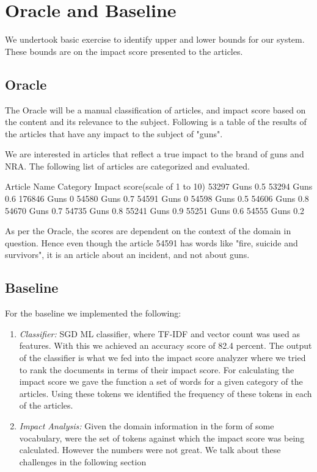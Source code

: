 \documentclass{article}
\begin{document}

\section{Oracle and Baseline} %

We undertook basic exercise to identify upper and lower bounds for our system. These bounds are on the impact score presented to the articles.

\subsection{Oracle}
The Oracle will be a manual classification of articles, and impact score based on the content and its relevance to the subject.
Following is a table of the results of the articles that have any impact to the subject of "guns".

We are interested in articles that reflect a true impact to the brand of guns and NRA.
The following list of articles are categorized and evaluated.

Article Name    Category    Impact score(scale of 1 to 10)
53297           Guns    0.5
53294           Guns    0.6
176846          Guns        0
54580           Guns      0.7
54591           Guns      0
54598           Guns        0.5
54606           Guns        0.8
54670           Guns        0.7
54735           Guns        0.8
55241           Guns        0.9
55251           Guns        0.6
54555           Guns        0.2

As per the Oracle, the scores are dependent on the context of the domain in question.
Hence even though the article 54591 has words like "fire, suicide and survivors", it is an article about an incident, and not about guns.


\subsection{Baseline}
For the baseline we implemented the following:

\begin{enumerate}
	\item \textit{Classifier:} SGD ML classifier, where TF-IDF and vector count was used as features. With this we achieved an accuracy score of 82.4 percent.
	The output of the classifier is what we fed into the impact score analyzer where we tried to rank the documents in terms of their impact score. For calculating the impact score we gave the function a set of words for a given category of the articles. Using these tokens we identified the frequency of these tokens in each of the articles. 

	\item \textit {Impact Analysis:} Given the domain information in the form of some vocabulary, were the set of tokens against which the impact score was being calculated.  However the numbers were not great. We talk about these challenges in the following section
\end{enumerate}
\end{document}
